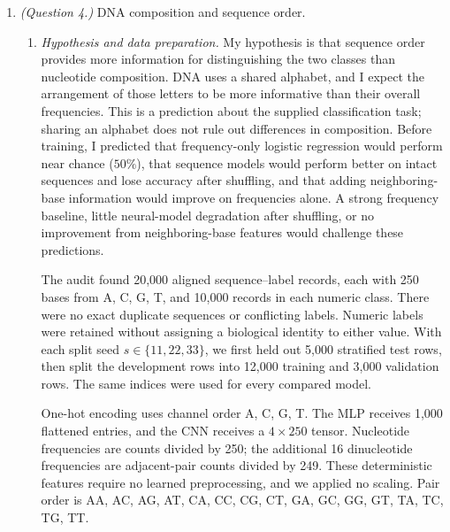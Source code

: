 \documentclass[12pt]{article}
\begin{document}
\begin{enumerate}
   \item \emph{(Question 4.)} DNA composition and sequence order.
   \begin{enumerate}[label=\textbf{\Alph*.}, leftmargin=*]
       \setlength{\emergencystretch}{2em}
       \item \emph{Hypothesis and data preparation.}
       My hypothesis is that sequence order provides more information
       for distinguishing the two classes than nucleotide composition.
       DNA uses a shared alphabet, and I expect the arrangement of those
       letters to be more informative than their overall frequencies.
       This is a prediction about the supplied classification task;
       sharing an alphabet does not rule out differences in composition.
       Before training, I predicted that frequency-only logistic regression
       would perform near chance ($50\%$), that sequence models would
       perform better on intact sequences and lose accuracy after
       shuffling, and that adding neighboring-base information would
       improve on frequencies alone. A strong frequency baseline, little
       neural-model degradation after shuffling, or no improvement from
       neighboring-base features would challenge these predictions.

       The audit found 20,000 aligned sequence--label records, each with
       250 bases from A, C, G, T, and 10,000 records in each numeric class.
       There were no exact duplicate sequences or conflicting labels.
       Numeric labels were retained without assigning a biological identity
       to either value. With each split seed $s\in\{11,22,33\}$, we first
       held out 5,000 stratified test rows, then split the development rows
       into 12,000 training and 3,000 validation rows. The same indices
       were used for every compared model.

       One-hot encoding uses channel order A, C, G, T. The MLP receives
       1,000 flattened entries, and the CNN receives a $4\times250$ tensor.
       Nucleotide frequencies are counts divided by 250; the additional
       16 dinucleotide frequencies are adjacent-pair counts divided by
       249. These deterministic features require no learned preprocessing,
       and we applied no scaling. Pair order is AA, AC, AG, AT, CA, CC,
       CG, CT, GA, GC, GG, GT, TA, TC, TG, TT.


\end{enumerate}
\end{enumerate}
\end{document}
